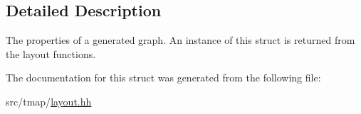 \subsection{Detailed Description}
The properties of a generated graph. An instance of this struct is returned from the layout functions. 

The documentation for this struct was generated from the following file\+:\begin{DoxyCompactItemize}
\item 
src/tmap/\hyperlink{layout_8hh}{layout.\+hh}\end{DoxyCompactItemize}
